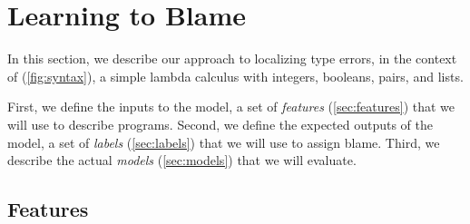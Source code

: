 \section{Learning to Blame}
\label{sec:learning}
In this section, we describe our approach to localizing type errors, in the
context
of \lang (\autoref{fig:syntax}), a simple lambda calculus with integers,
booleans, pairs, and lists.
%

%
First, we define the inputs to the model, a set of \emph{features}
(\autoref{sec:features}) that we will use to describe programs.
%
Second, we define the expected outputs of the model, a set of
\emph{labels} (\autoref{sec:labels}) that we will use to assign blame.
%
Third, we describe the actual \emph{models} (\autoref{sec:models}) that we
will evaluate.

\subsection{Features}
\label{sec:features}

